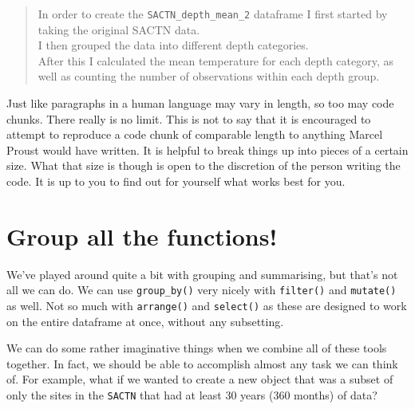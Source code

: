 \documentclass[]{book}
\newenvironment{Shaded}{\begin{snugshade}}{\end{snugshade}}
\newcommand{\KeywordTok}[1]{\textcolor[rgb]{0.13,0.29,0.53}{\textbf{#1}}}
\newcommand{\DecValTok}[1]{\textcolor[rgb]{0.00,0.00,0.81}{#1}}
\newcommand{\StringTok}[1]{\textcolor[rgb]{0.31,0.60,0.02}{#1}}
\newcommand{\OperatorTok}[1]{\textcolor[rgb]{0.81,0.36,0.00}{\textbf{#1}}}
\newcommand{\NormalTok}[1]{#1}
\theoremstyle{definition}
\theoremstyle{definition}
\theoremstyle{definition}
\theoremstyle{remark}
\begin{document}
\begin{quote}
In order to create the \texttt{SACTN\_depth\_mean\_2} dataframe I first
started by taking the original SACTN data.\\
I then grouped the data into different depth categories.\\
After this I calculated the mean temperature for each depth category, as
well as counting the number of observations within each depth group.
\end{quote}

Just like paragraphs in a human language may vary in length, so too may
code chunks. There really is no limit. This is not to say that it is
encouraged to attempt to reproduce a code chunk of comparable length to
anything Marcel Proust would have written. It is helpful to break things
up into pieces of a certain size. What that size is though is open to
the discretion of the person writing the code. It is up to you to find
out for yourself what works best for you.

\section{Group all the functions!}\label{group-all-the-functions}

We've played around quite a bit with grouping and summarising, but
that's not all we can do. We can use \texttt{group\_by()} very nicely
with \texttt{filter()} and \texttt{mutate()} as well. Not so much with
\texttt{arrange()} and \texttt{select()} as these are designed to work
on the entire dataframe at once, without any subsetting.

We can do some rather imaginative things when we combine all of these
tools together. In fact, we should be able to accomplish almost any task
we can think of. For example, what if we wanted to create a new object
that was a subset of only the sites in the \texttt{SACTN} that had at
least 30 years (360 months) of data?

\begin{Shaded}
\end{Shaded}
\end{document}
